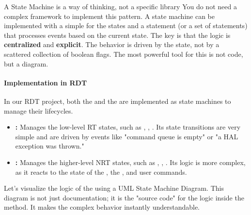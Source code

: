 \begin{tipbox}{A State Machine is a way of thinking, not a specific library}
You do not need a complex framework to implement this pattern. A state machine can be implemented with a simple  for the states and a  statement (or a set of  statements) that processes events based on the current state. The key is that the logic is \textbf{centralized} and \textbf{explicit}. The behavior is driven by the state, not by a scattered collection of boolean flags. The most powerful tool for this is not code, but a diagram.
\end{tipbox}

\paragraph{Implementation in RDT}
In our RDT project, both the  and the  are implemented as state machines to manage their lifecycles.
\begin{itemize}
    \item \textbf{:} Manages the low-level RT states, such as , , . Its state transitions are very simple and are driven by events like "command queue is empty" or "a HAL exception was thrown."
    \item \textbf{:} Manages the higher-level NRT states, such as , , . Its logic is more complex, as it reacts to the state of the , the , and user commands.
\end{itemize}

Let's visualize the logic of the  using a UML State Machine Diagram. This diagram is not just documentation; it is the "source code" for the logic inside the  method. It makes the complex behavior instantly understandable.


